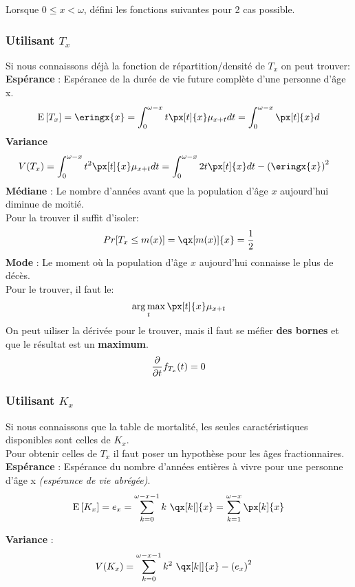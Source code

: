 \documentclass[10pt, french]{article}
\DeclareMathOperator*{\argmax}{arg\,max}
\begin{document}
\begin{multicols*}{3}
Lorsque $0 \leq x < \omega $, défini les fonctions suivantes pour 2 cas possible.

\subsubsection*{Utilisant $T_x$}
Si nous connaissons déjà la fonction de répartition/densité de $T_x$ on peut trouver:\\

\textbf{Espérance} : Espérance de la durée de vie future complète d'une personne d'âge x.
	\[	
		\esp{T_x} = 
		\eringx{x} =  
		\int_{0}^{\omega - x} t \px[t]{x} \mu_{x+t} dt = 
		\int_{0}^{\omega - x} \px[t]{x} d
	\]
\textbf{Variance}
	\begin{align*}
		V(T_x) &= 
		\int_{0}^{\omega - x} t^2 \px[t]{x} \mu_{x+t} dt = 
		\int_{0}^{\omega - x} 2 t  \px[t]{x} dt - \left(\eringx{x}\right)^2 
	\end{align*}
\textbf{Médiane} : Le nombre d'années avant que la population d'âge $x$ aujourd'hui diminue de moitié. \\
	Pour la trouver il suffit d'isoler:
	\[
		Pr[T_x \leq m(x)] = \qx[m(x)]{x} = \frac{1}{2}
	\]
\textbf{Mode} : Le moment où la population d'âge $x$ aujourd'hui connaisse le plus de décès.\\
	Pour le trouver, il faut le: 
	\[ \argmax_t \px[t]{x} \mu_{x + t} \]
	On peut uiliser la dérivée pour le trouver, mais il faut se méfier \textbf{des bornes} et que le résultat est un \textbf{maximum}.
	\[
		\frac{\partial}{\partial t} f_{T_x}(t) = 0
	\]	

\subsubsection*{Utilisant $K_x$}
Si nous connaissons que la table de mortalité, les seules caractéristiques disponibles sont celles de $K_x$. \\
Pour obtenir celles de $T_x$ il faut poser un hypothèse pour les âges fractionnaires.\\

\textbf{Espérance} : Espérance du nombre d'années entières à vivre pour une personne d'âge x \textit{(espérance de vie abrégée)}.
	\[	
		\esp{K_x} = 
		e_{x} =  
		\sum_{k = 0}^{\omega - x - 1} k \ \qx[k | ]{x} =  
		\sum_{k = 1}^{\omega - x} \px[k]{x} 
	\]

\textbf{Variance} :  
	\begin{align*}
		V(K_x) &= 
		\sum_{k = 0}^{\omega - x - 1} k^2 \ \qx[k | ]{x} - \left(e_{x}\right)^2 
	\end{align*}


\end{multicols*}
\end{document}
